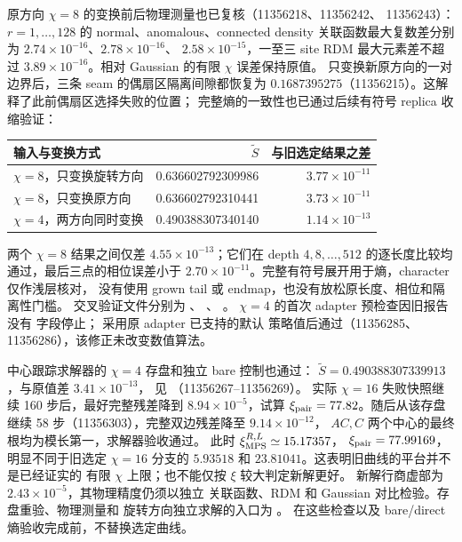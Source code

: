 原方向 $\chi=8$ 的变换前后物理测量也已复核（11356218、11356242、
11356243）：$r=1,\ldots,128$ 的 normal、anomalous、connected density
关联函数最大复数差分别为 $2.74\times10^{-16}$、$2.78\times10^{-16}$、
$2.58\times10^{-15}$，一至三 site RDM 最大元素差不超过
$3.89\times10^{-16}$。相对 Gaussian 的有限 $\chi$ 误差保持原值。
只变换新原方向的一对边界后，三条 seam 的偶扇区隔离间隙都恢复为
$0.1687395275$（11356215）。这解释了此前偶扇区选择失败的位置；
完整熵的一致性也已通过后续有符号 replica 收缩验证：
\begin{center}
\begin{tabular}{l|rr}
输入与变换方式 & $\widetilde S$ & 与旧选定结果之差\\\hline
$\chi=8$，只变换旋转方向 & 0.636602792309986 & $3.77\times10^{-11}$\\
$\chi=8$，只变换原方向 & 0.636602792310441 & $3.73\times10^{-11}$\\
$\chi=4$，两方向同时变换 & 0.490388307340140 & $1.14\times10^{-13}$
\end{tabular}
\end{center}
两个 $\chi=8$ 结果之间仅差 $4.55\times10^{-13}$；它们在
depth $4,8,\ldots,512$ 的逐长度比较均通过，最后三点的相位误差小于
$2.70\times10^{-11}$。完整有符号展开用于熵，character 仅作浅层核对，
没有使用 grown tail 或 endmap，也没有放松原长度、相位和隔离性门槛。
交叉验证文件分别为
、
、
。
$\chi=4$ 的首次 adapter 预检查因旧报告没有 
字段停止； 采用原 adapter 已支持的默认
策略值后通过（11356285、11356286），该修正未改变数值算法。

中心跟踪求解器的 $\chi=4$ 存盘和独立 bare 控制也通过：
$\widetilde S=0.490388307339913$，与原值差 $3.41\times10^{-13}$，
见 （11356267--11356269）。
实际 $\chi=16$ 失败快照继续 160 步后，最好完整残差降到
$8.94\times10^{-5}$，试算 $\xi_{\rm pair}=77.82$。随后从该存盘继续
58 步（11356303），完整双边残差降至 $9.14\times10^{-12}$，
$AC,C$ 两个中心的最终根均为模长第一，求解器验收通过。
此时 $\xi_{\rm MPS}^{R,L}\simeq15.17357$，
$\xi_{\rm pair}=77.99169$，明显不同于旧选定 $\chi=16$ 分支的
$5.93518$ 和 $23.81041$。这表明旧曲线的平台并不是已经证实的
有限 $\chi$ 上限；也不能仅按 $\xi$ 较大判定新解更好。
新解行商虚部为 $2.43\times10^{-5}$，其物理精度仍须以独立
关联函数、RDM 和 Gaussian 对比检验。存盘重验、物理测量和
旋转方向独立求解的入口为 。
在这些检查以及 bare/direct 熵验收完成前，不替换选定曲线。

